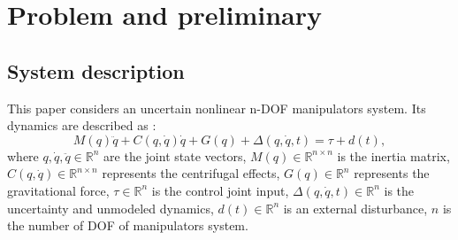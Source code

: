 \documentclass[pdflatex,sn-mathphys-num]{sn-jnl}%
\theoremstyle{thmstyleone}%
\theoremstyle{thmstyletwo}%
\theoremstyle{thmstylethree}%
\begin{document}



\section{Problem and preliminary}


\subsection{System description}
\par This paper considers an uncertain nonlinear n-DOF manipulators system. Its dynamics are described as \cite{SciaviccoSiciliano_2012_ModellingControl,BagheriEtAl_2019_Feedbacklinearization}:
\begin{equation}
	M(q)\ddot{q} + C(q, \dot{q})\dot{q} + G(q)+ \Delta(q, \dot{q}, t)= \tau + d(t),
	\label{eq:1}
\end{equation}
where $ q, \dot{q}, \ddot{q} \in \mathbb{R}^n $ are the joint state vectors, $M(q) \in \mathbb{R}^{n\times n}$ is the inertia matrix, $C(q, \dot{q}) \in \mathbb{R}^{n\times n} $ represents the centrifugal effects, $G(q) \in \mathbb{R}^n $ represents the gravitational force, $\tau \in \mathbb{R}^n$ is the control joint input, $\Delta(q, \dot{q}, t) \in \mathbb{R}^n$ is the uncertainty and unmodeled dynamics, $d(t) \in \mathbb{R}^n$ is an external disturbance, $n$ is the number of DOF of manipulators system.
\end{document}

